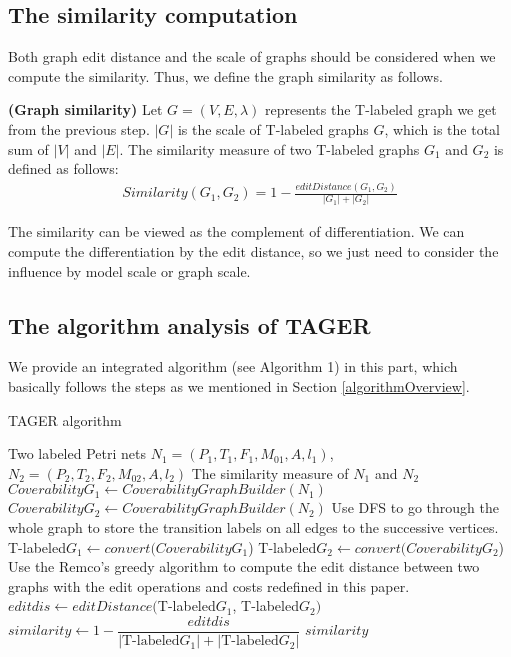 \documentclass{llncs}
\begin{document}
\subsection{The similarity computation}\label{Similarity}

Both graph edit distance and the scale of graphs should be considered when we compute the similarity. Thus, we define the graph similarity as follows.
\begin{definition}\textbf{(Graph similarity)}
Let $G=(V,E,\lambda)$ represents the T-labeled graph we get from the previous step.
$|G|$ is the scale of  T-labeled graphs $G$, which is the total sum of $|V|$ and $|E|$.
The similarity measure of two T-labeled graphs $G_{1}$ and $G_{2}$ is defined as follows:
\begin{equation}
\begin{aligned}
Similarity(G_{1},G_{2})=1-\frac{editDistance(G_{1},G_{2})}{|G_{1}|+|G_{2}|}
\end{aligned}
\end{equation}
\end{definition}
The similarity can be viewed as the complement of differentiation. %
We can compute the differentiation by the edit distance, so we just need to consider the influence by model scale or graph scale.

\subsection{The algorithm analysis of TAGER }\label{TAGERAlgorithm}
We provide an integrated algorithm (see Algorithm 1) in this part, which basically follows the steps as we mentioned in Section \ref{algorithmOverview}.

\begin{algorithm}[!htb]
\caption {TAGER algorithm}
\begin{algorithmic}
\Require Two labeled Petri nets $N_{1}=(P_{1},T_{1},F_{1},M_{01},A,l_{1})$, $N_{2}=(P_{2},T_{2},F_{2},M_{02},A,l_{2})$
\Ensure The similarity measure of $N_{1}$ and $N_{2}$
\State $CoverabilityG_{1} \gets CoverabilityGraphBuilder(N_{1})$
\State $CoverabilityG_{2} \gets CoverabilityGraphBuilder(N_{2})$
\State Use DFS to go through the whole graph to store the transition labels on all edges to the successive vertices.
\State T-labeled$G_{1} \gets convert(CoverabilityG_{1}$)
\State T-labeled$G_{2} \gets convert(CoverabilityG_{2}$)
\State Use the Remco's greedy algorithm \cite{dijkman2009graph} to compute the edit distance between two graphs with the edit operations and costs redefined in this paper.
\State $editdis \gets editDistance($T-labeled$G_{1}$, T-labeled$G_{2})$
\State $similarity\gets 1- \dfrac{editdis}{|\text{T-labeled}G_{1}|+|\text{T-labeled}G_{2}|}$
\State \Return $similarity$
\end{algorithmic}
\end{algorithm}
\end{document}
